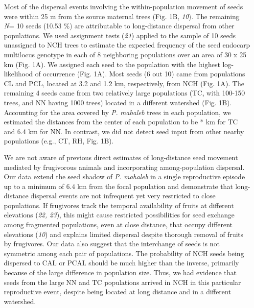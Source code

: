 \documentclass[a4paper,12pt]{article}
\begin{document}
\begin{bibunit}[science]
\begin{linenumbers}
\begin{spacing}{2}
Most of the dispersal events involving the within-population movement of seeds were within 25 m from the source maternal trees (Fig. 1B, \textit{10}). The remaining \textit{N}= 10 seeds (10.53 \%) are attributable to long-distance dispersal from other populations. We used assignment tests (\textit{21}) applied to the sample of 10 seeds unassigned to NCH trees to estimate the expected frequency of the seed endocarp multilocus genotype in each of 8 neighboring populations over an area of 30 x 25 km (Fig. 1A). We assigned each seed to the population with the highest log-likelihood of occurrence (Fig. 1A). Most seeds (6 out 10) came from populations CL and PCL, located at 3.2 and 1.2 km, respectively, from NCH (Fig. 1A). The remaining 4 seeds came from two relatively large populations (TC, with 100-150 trees, and NN having \texttt{} 1000 trees) located in a different watershed (Fig. 1B). Accounting for the area covered by \textit{P. mahaleb} trees in each population, we estimated the distances from the center of each population to be * km for TC and 6.4 km for NN. In contrast, we did not detect seed input from other nearby populations (e.g., CT, RH, Fig. 1B).

We are not aware of previous direct estimates of long-distance seed movement mediated by frugivorous animals and incorporating among-population dispersal. Our data extend the seed shadow of \textit{P. mahaleb} in a single reproductive episode up to a minimum of 6.4 km from the focal population and demonstrate that long-distance dispersal events are not infrequent yet very restricted to close populations. If frugivores track the temporal availability of fruits at different elevations (\textit{22, 23}), this might cause restricted possibilities for seed exchange among fragmented populations, even at close distance, that occupy different elevations (\textit{10}) and explains limited dispersal despite thorough removal of fruits by frugivores. Our data also suggest that the interchange of seeds is not symmetric among each pair of populations. The probability of NCH seeds being dispersed to CAL or PCAL should be much higher than the inverse, primarily because of the large difference in population size. Thus, we had evidence that seeds from the large NN and TC populations arrived in NCH in this particular reproductive event, despite being located at long distance and in a different watershed.


\end{spacing}
\end{linenumbers}
\end{bibunit}
\end{document}
